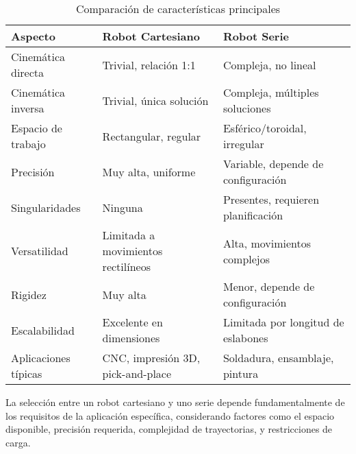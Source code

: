 \begin{table}[h]
\centering
\caption{Comparación de características principales}
\begin{tabular}{|l|p{5.5cm}|p{5.5cm}|}
\hline
\textbf{Aspecto} & \textbf{Robot Cartesiano} & \textbf{Robot Serie} \\
\hline
Cinemática directa & Trivial, relación 1:1 & Compleja, no lineal \\
\hline
Cinemática inversa & Trivial, única solución & Compleja, múltiples soluciones \\
\hline
Espacio de trabajo & Rectangular, regular & Esférico/toroidal, irregular \\
\hline
Precisión & Muy alta, uniforme & Variable, depende de configuración \\
\hline
Singularidades & Ninguna & Presentes, requieren planificación \\
\hline
Versatilidad & Limitada a movimientos rectilíneos & Alta, movimientos complejos \\
\hline
Rigidez & Muy alta & Menor, depende de configuración \\
\hline
Escalabilidad & Excelente en dimensiones & Limitada por longitud de eslabones \\
\hline
Aplicaciones típicas & CNC, impresión 3D, pick-and-place & Soldadura, ensamblaje, pintura \\
\hline
\end{tabular}
\end{table}

La selección entre un robot cartesiano y uno serie depende fundamentalmente de los requisitos de la aplicación específica, considerando factores como el espacio disponible, precisión requerida, complejidad de trayectorias, y restricciones de carga.